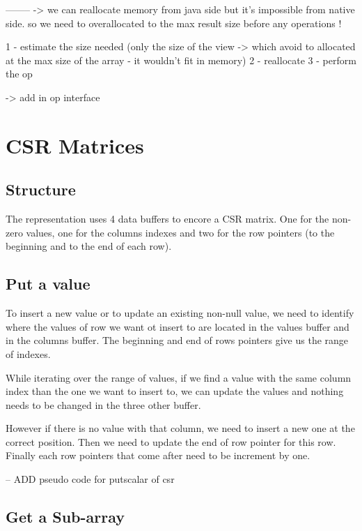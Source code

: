 --------
-> we can reallocate memory from java side but it's impossible from native side. so we need to overallocated to the max result size before any operations !

1 - estimate the size needed (only the size of the view -> which avoid to allocated at the max size of the array - it wouldn't fit in memory)
2 - reallocate
3 - perform the op

-> add in op interface


\section{CSR Matrices}
\subsection{Structure}

The representation uses 4 data buffers to encore a CSR matrix. One for the non-zero values, one for the columns indexes and two for the row pointers (to the beginning and to the end of each row).

\subsection{Put a value}

To insert a new value or to update an existing non-null value, we need to identify where the values of row we want ot insert to are located in the values buffer and in the columns buffer. The beginning and end of rows pointers give us the range of indexes.

While iterating over the range of values, if we find a value with the same column index than the one we want to insert to, we can update the values and nothing needs to be changed in the three other buffer. 

However if there is no value with that column, we need to insert a new one at the correct position. Then we need to update the end of row pointer for this row. Finally each row pointers that come after need to be increment by one.


-- ADD pseudo code for putscalar of csr




\subsection{Get a Sub-array}

